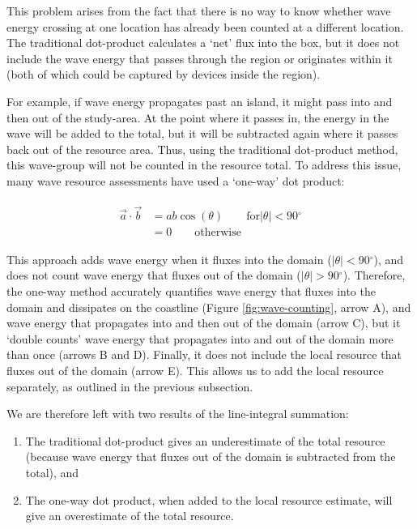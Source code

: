 \documentclass[authoryear,preprint]{elsarticle}
\newcommand{\degrees}[0]{\ensuremath{^\circ}}
\begin{document}
This problem arises from the fact that there is no way to know whether wave energy crossing at one location has already been counted at a different location. The traditional dot-product calculates a ‘net’ flux into the box, but it does not include the wave energy that passes through the region or originates within it (both of which could be captured by devices inside the region).

For example, if wave energy propagates past an island, it might pass into and then out of the study-area. At the point where it passes in, the energy in the wave will be added to the total, but it will be subtracted again where it passes back out of the resource area. Thus, using the traditional dot-product method, this wave-group will not be counted in the resource total. To address this issue, many wave resource assessments have used a ‘one-way’ dot product:

\begin{align} \label{eqn:oneway}
\begin{split}
  \vec{a} \cdot \vec{b} & = ab \cos(\theta) \qquad \mathrm{for} |\theta| < 90 \degrees\\
      & = 0 \qquad \mathrm{otherwise}
  \end{split}
\end{align}

This approach adds wave energy when it fluxes into the domain ($|\theta| < 90\degrees$), and does not count wave energy that fluxes out of the domain ($|\theta| > 90\degrees$). Therefore, the one-way method accurately quantifies wave energy that fluxes into the domain and dissipates on the coastline (Figure \ref{fig:wave-counting}, arrow A), and wave energy that propagates into and then out of the domain (arrow C), but it ‘double counts’ wave energy that propagates into and out of the domain more than once (arrows B and D). Finally, it does not include the local resource that fluxes out of the domain (arrow E). This allows us to add the local resource separately, as outlined in the previous subsection.

We are therefore left with two results of the line-integral summation:
\begin{enumerate}
\item The traditional dot-product gives an underestimate of the total resource (because wave energy that fluxes out of the domain is subtracted from the total), and
\item The one-way dot product, when added to the local resource estimate, will give an overestimate of the total resource.
\end{enumerate}
\end{document}
